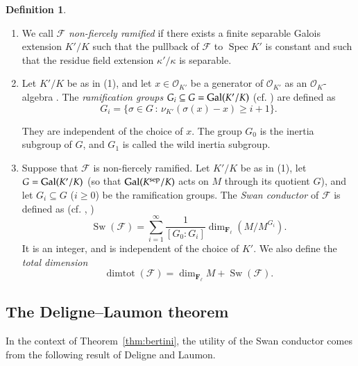 \documentclass[twoside]{amsart}
\newcommand{\FF}{\mathbf{F}}
\newcommand{\Ff}{\mathscr{F}}
\newcommand{\Oo}{\mathscr{O}}
\DeclareMathOperator{\Spec}{Spec}
\DeclareMathOperator{\Swan}{Sw}
\DeclareMathOperator{\dimtot}{dimtot}
\theoremstyle{plain}
\theoremstyle{definition}
\newtheorem{definition}[subsubsection]{Definition}
\theoremstyle{remark}
\numberwithin{equation}{subsection}
\begin{document}
\begin{definition} \label{def:swan}
	\begin{enumerate}[(1)]
		\item We call $\Ff$ \emph{non-fiercely ramified} if there exists a finite separable Galois extension $K'/K$ such that the pullback of $\Ff$ to $\Spec K'$ is constant and such that the residue field extension $\kappa'/\kappa$ is separable. 
		\item Let $K'/K$ be as in (1), and let $x \in \Oo_{K'}$ be a generator of $\Oo_{K'}$ as an $\Oo_K$-algebra \cite[Chap.~III, Prop.~12]{SerreCorpsLocaux}. The \emph{ramification groups} $G_i \subseteq G = {\rm Gal}(K'/K)$ (cf. \cite[Chapter IV, \S 1]{SerreCorpsLocaux}) are defined as
		\[ 
			G_i = \{ \sigma \in G \, : \, \nu_{K'}(\sigma(x)-x) \geq i+1\}.
		\]

		They are independent of the choice of $x$. The group $G_0$ is the inertia subgroup of $G$, and $G_1$ is called the wild inertia subgroup.
		\item Suppose that $\Ff$ is non-fiercely ramified. Let $K'/K$ be as in (1), let $G={\rm Gal}(K'/K)$ (so that ${\rm Gal}(K^{\rm sep}/K)$ acts on $M$ through its quotient $G$), and let $G_i\subseteq G$ ($i\geq 0$) be the ramification groups.  The \emph{Swan conductor} of $\Ff$ is defined as (cf. \cite[\S 19.3]{SerreLinearReps}, \cite[\S 1.1]{Laumon})
		\[ 
			\Swan(\Ff) = \sum_{i=1}^\infty \frac{1}{[G_0:G_i]} \dim_{\FF_\ell} (M/M^{G_i}).
		\]
		It is an integer, and is independent of the choice of $K'$. We also define the \emph{total dimension}
		\[ 
			\dimtot(\Ff) = \dim_{\FF_\ell} M + \Swan(\Ff).
		\]
	\end{enumerate}
\end{definition}

\subsection{The Deligne--Laumon theorem}

In the context of Theorem~\ref{thm:bertini}, the utility of the Swan conductor comes from the following result of Deligne and Laumon.
\end{document}
